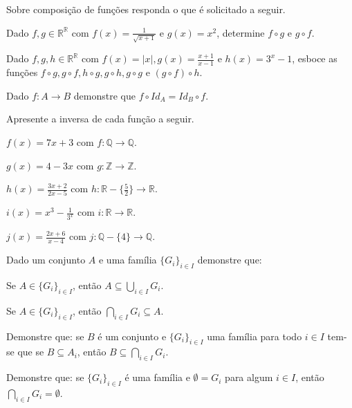 \begin{questao}\label{prob:Funcao10}
  Sobre composição de funções responda o que é solicitado a seguir.
\end{questao}

\begin{exerList}
	\item Dado $f, g \in \mathbb{R}^\mathbb{R}$ com $f(x) = \frac{1}{\sqrt{x+1}}$ e $g(x) = x^2$, determine $f \circ g$ e $g \circ f$.
	\item Dado $f, g, h \in \mathbb{R}^\mathbb{R}$ com $f(x) = |x|, g(x) = \frac{x+1}{x-1}$ e $h(x) = 3^x - 1$, esboce as funções $f \circ g, g \circ f, h \circ g, g \circ h, g \circ g$ e $(g \circ f) \circ h$.
\end{exerList}

\begin{questao}\label{prob:Funcao11}
	Dado $f: A \rightarrow B$ demonstre que $f \circ Id_A = Id_B \circ f$.
\end{questao}

\begin{questao}\label{prob:Funcao12}
	Apresente a inversa de cada função a seguir.
\end{questao}

\begin{exerList}
	\item $f(x) = 7x + 3$ com $f: \mathbb{Q} \rightarrow \mathbb{Q}$.
	\item $g(x) = 4 - 3x$ com $g: \mathbb{Z} \rightarrow \mathbb{Z}$.
	\item $h(x) = \frac{3x + 2}{2x-5}$ com $h: \mathbb{R} - \{\frac{5}{2}\} \rightarrow \mathbb{R}$.
	\item $i(x) = x^3 - \frac{1}{3^x}$ com $i: \mathbb{R} \rightarrow \mathbb{R}$.
	\item $j(x) = \frac{2x + 6}{x - 4}$ com $j: \mathbb{Q} - \{4\} \rightarrow \mathbb{Q}$.
\end{exerList}


\begin{questao}\label{prob:Funcao15}
	Dado um conjunto $A$ e uma família $\{G_i\}_{i \in I}$ demonstre que:
\end{questao}

\begin{exerList}
	\item Se $A \in \{G_i\}_{i \in I}$, então $A \subseteq \displaystyle\bigcup_{i \in I} G_i$.
	\item Se $A \in \{G_i\}_{i \in I}$, então $\displaystyle\bigcap_{i \in I} G_i \subseteq A$.
\end{exerList}

\begin{questao}\label{prob:Funcao16}
	Demonstre que: se $B$ é um conjunto e $\{G_i\}_{i \in I}$ uma família para todo $i \in I$ tem-se que se $B \subseteq A_i$, então $B \subseteq \displaystyle\bigcap_{i \in I} G_i$.
\end{questao}

\begin{questao}\label{prob:Funcao17}
	Demonstre que: se $\{G_i\}_{i \in I}$ é uma família e $\emptyset = G_i$ para algum $i \in I$, então $\displaystyle\bigcap_{i \in I} G_i = \emptyset$.
\end{questao}